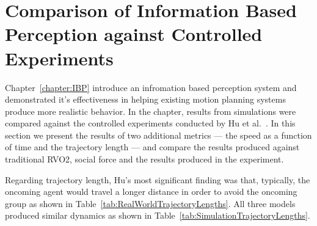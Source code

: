 
\chapter{Comparison of Information Based Perception against Controlled Experiments} %
\label{cha:speed_experiment_comparison}

Chapter~\ref{chapter:IBP} introduce an infromation based perception system and demonstrated it's effectiveness in helping existing motion planning systems produce more realistic behavior. In the chapter, results from simulations were compared against the controlled experiments conducted by Hu et al.~\cite{hunanThesis,HuNan2013}. In this section we present the results of two additional metrics --- the speed as a function of time and the trajectory length --- and compare the results produced against traditional RVO2, social force and the results produced in the experiment.

Regarding trajectory length, Hu's most significant finding was that, typically, the oncoming agent would travel a longer distance in order to avoid the oncoming group as shown in Table~\ref{tab:RealWorldTrajectoryLengths}. All three models produced similar dynamics as shown in Table~\ref{tab:SimulationTrajectoryLengths}.


